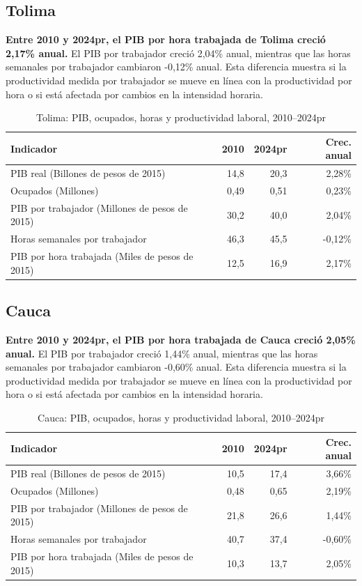 \subsection{Tolima}
\textbf{Entre 2010 y 2024pr, el PIB por hora trabajada de Tolima creció 2,17\% anual.} El PIB por trabajador creció 2,04\% anual, mientras que las horas semanales por trabajador cambiaron -0,12\% anual. Esta diferencia muestra si la productividad medida por trabajador se mueve en línea con la productividad por hora o si está afectada por cambios en la intensidad horaria.
\begin{table}[H]
\centering
\caption{Tolima: PIB, ocupados, horas y productividad laboral, 2010--2024pr}
\label{tab:departamento_tolima_productividad}
\scriptsize
\begin{tabular}{lrrr}
\toprule
Indicador & 2010 & 2024pr & Crec. anual \\
\midrule
PIB real (Billones de pesos de 2015) & 14,8 & 20,3 & 2,28\% \\
Ocupados (Millones) & 0,49 & 0,51 & 0,23\% \\
PIB por trabajador (Millones de pesos de 2015) & 30,2 & 40,0 & 2,04\% \\
Horas semanales por trabajador & 46,3 & 45,5 & -0,12\% \\
PIB por hora trabajada (Miles de pesos de 2015) & 12,5 & 16,9 & 2,17\% \\
\bottomrule
\end{tabular}
\end{table}

\subsection{Cauca}
\textbf{Entre 2010 y 2024pr, el PIB por hora trabajada de Cauca creció 2,05\% anual.} El PIB por trabajador creció 1,44\% anual, mientras que las horas semanales por trabajador cambiaron -0,60\% anual. Esta diferencia muestra si la productividad medida por trabajador se mueve en línea con la productividad por hora o si está afectada por cambios en la intensidad horaria.
\begin{table}[H]
\centering
\caption{Cauca: PIB, ocupados, horas y productividad laboral, 2010--2024pr}
\label{tab:departamento_cauca_productividad}
\scriptsize
\begin{tabular}{lrrr}
\toprule
Indicador & 2010 & 2024pr & Crec. anual \\
\midrule
PIB real (Billones de pesos de 2015) & 10,5 & 17,4 & 3,66\% \\
Ocupados (Millones) & 0,48 & 0,65 & 2,19\% \\
PIB por trabajador (Millones de pesos de 2015) & 21,8 & 26,6 & 1,44\% \\
Horas semanales por trabajador & 40,7 & 37,4 & -0,60\% \\
PIB por hora trabajada (Miles de pesos de 2015) & 10,3 & 13,7 & 2,05\% \\
\bottomrule
\end{tabular}
\end{table}

